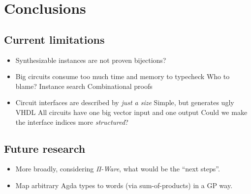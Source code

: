\chapter{Conclusions}
\label{chap:conclusions}

    \section{Current limitations}
    \label{sec:current-limitations}
        \begin{itemize}
            \item Synthesizable instances are not proven bijections?
            \item Big circuits consume too much time and memory to typecheck
                \subitem Who to blame?
                \subitem Instance search
                \subitem Combinational proofs
            \item Circuit interfaces are described by \emph{just a size}
                \subitem Simple, but generates ugly VHDL
                \subitem All circuits have one big vector input and one output
                \subitem Could we make the interface indices more \emph{structured}?
        \end{itemize}

    \section{Future research}
    \label{sec:future-research}
        \begin{itemize}
            \item More broadly, considering \emph{Π-Ware}, what would be the ``next steps''.
            \item Map arbitrary Agda types to words (via sum-of-products) in a GP way.
        \end{itemize}

